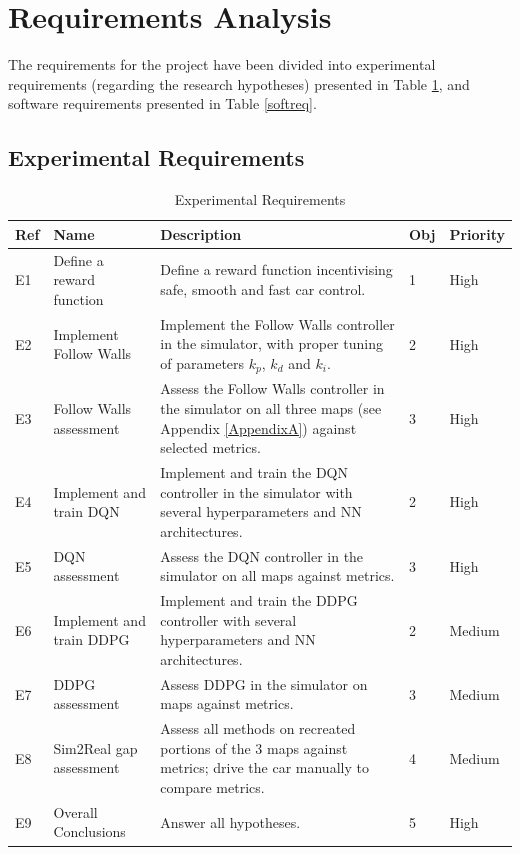 \section{Requirements Analysis}
\label{reqana}
The requirements for the project have been divided into experimental requirements (regarding the research hypotheses) presented in Table \ref{expreqtab}, and software requirements presented in Table \ref{softreq}.
\subsection{Experimental Requirements}
\label{expreq}


\begin{table}[H]
\centering
\begin{tabularx}{\textwidth}{||l|l|X|l|l||} 
 \hline
 Ref & Name & Description & Obj & Priority\\ [0.5ex] 
 \hline\hline
 E1 & Define a reward function & Define a reward function incentivising safe, smooth and fast car control. & 1 & High \\
 \hline
 E2 & Implement Follow Walls & Implement the Follow Walls controller in the simulator, with proper tuning of parameters $k_p$, $k_d$ and $k_i$. & 2 & High \\
 \hline
 E3 & Follow Walls assessment & Assess the Follow Walls controller in the simulator on all three maps (see Appendix \ref{AppendixA}) against selected metrics. & 3 & High \\
 \hline
 E4 & Implement and train DQN & Implement and train the DQN controller in the simulator with several hyperparameters and NN architectures. & 2 & High \\
 \hline
 E5 & DQN assessment & Assess the DQN controller in the simulator on all maps against metrics. & 3 & High \\ [1ex]
  \hline
 E6 & Implement and train DDPG & Implement and train the DDPG controller with several hyperparameters and NN architectures. & 2 & Medium \\
  \hline
 E7 & DDPG assessment & Assess DDPG in the simulator on maps against metrics. & 3 & Medium \\ 
 \hline
 E8 & Sim2Real gap assessment & Assess all methods on recreated portions of the 3 maps against metrics; drive the car manually to compare metrics. & 4 & Medium \\
  \hline
 E9 & Overall Conclusions & Answer all hypotheses. & 5 & High \\ [1ex]
  \hline
\end{tabularx}
\caption{Experimental Requirements}
\label{expreqtab}
\end{table}


